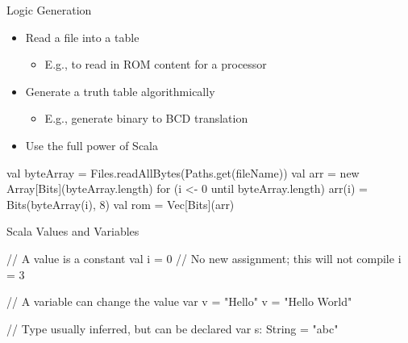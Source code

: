 \begin{frame}[fragile]{Logic Generation}
\begin{itemize}
\item Read a file into a table
\begin{itemize}
\item E.g., to read in ROM content for a processor
\end{itemize}
\item Generate a truth table algorithmically
\begin{itemize}
\item E.g., generate binary to BCD translation
\end{itemize}
\item Use the full power of Scala
\end{itemize}
\begin{chisel}
val byteArray = Files.readAllBytes(Paths.get(fileName))
val arr = new Array[Bits](byteArray.length)
for (i <- 0 until byteArray.length) {
  arr(i) = Bits(byteArray(i), 8)
}
val rom = Vec[Bits](arr)
\end{chisel}
\end{frame}
%

\begin{frame}[fragile]{Scala Values and Variables}
\begin{chisel}
// A value is a constant
val i = 0
// No new assignment; this will not compile
i = 3

// A variable can change the value
var v = "Hello"
v = "Hello World"

// Type usually inferred, but can be declared
var s: String = "abc"
\end{chisel}
\end{frame}

